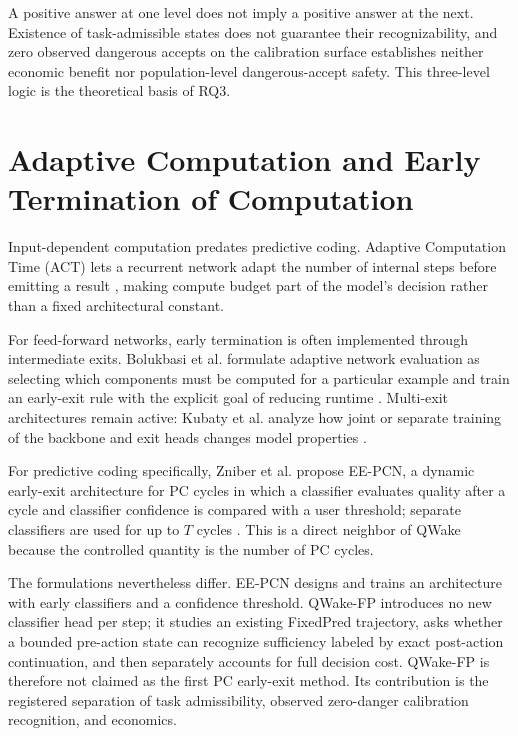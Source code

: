 A positive answer at one level does not imply a positive answer at the next. Existence
of task-admissible states does not guarantee their recognizability, and zero observed
dangerous accepts on the calibration surface establishes neither economic benefit nor
population-level dangerous-accept safety. This three-level logic is the theoretical
basis of RQ3.

\section{Adaptive Computation and Early Termination of Computation}
\label{sec:related-adaptive-computation}

Input-dependent computation predates predictive coding. Adaptive Computation Time
(ACT) lets a recurrent network adapt the number of internal steps before emitting a
result \cite{graves2016adaptive}, making compute budget part of the model's decision
rather than a fixed architectural constant.

For feed-forward networks, early termination is often implemented through intermediate
exits. Bolukbasi et al. formulate adaptive network evaluation as selecting which
components must be computed for a particular example and train an early-exit rule with
the explicit goal of reducing runtime \cite{bolukbasi2017adaptive}. Multi-exit
architectures remain active: Kubaty et al. analyze how joint or separate training of
the backbone and exit heads changes model properties \cite{kubaty2025multiexit}.

For predictive coding specifically, Zniber et al. propose EE-PCN, a dynamic early-exit
architecture for PC cycles in which a classifier evaluates quality after a cycle and
classifier confidence is compared with a user threshold; separate classifiers are used
for up to $T$ cycles \cite{zniber2025earlyexit}. This is a direct neighbor of QWake
because the controlled quantity is the number of PC cycles.

The formulations nevertheless differ. EE-PCN designs and trains an architecture with
early classifiers and a confidence threshold. QWake-FP introduces no new classifier
head per step; it studies an existing FixedPred trajectory, asks whether a bounded
pre-action state can recognize sufficiency labeled by exact post-action continuation,
and then separately accounts for full decision cost. QWake-FP is therefore not claimed
as the first PC early-exit method. Its contribution is the registered separation of
task admissibility, observed zero-danger calibration recognition, and economics.

